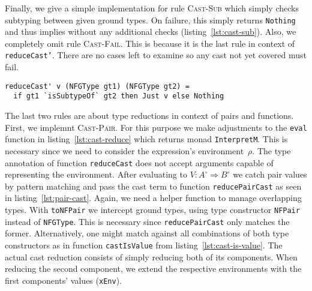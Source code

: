 Finally, we give a simple implementation for rule \textsc{Cast-Sub} which simply checks subtyping between given ground types. On failure, this simply returns \texttt{Nothing} and thus implies \blame without any additional checks (listing~\ref{lst:cast-sub}). Also, we completely omit rule \textsc{Cast-Fail}. This is because it is the last rule in context of \texttt{reduceCast'}. There are no cases left to examine so any cast not yet covered must fail.

\begin{lstlisting}[float,
	caption=Haskell: Rule \textsc{Cast-Sub} (\texttt{Interpreter.hs}),
	label=lst:cast-sub]
reduceCast' v (NFGType gt1) (NFGType gt2) =
  if gt1 `isSubtypeOf` gt2 then Just v else Nothing
\end{lstlisting}

The last two rules are about type reductions in context of pairs and functions. First, we implemnt \textsc{Cast-Pair}. For this purpose we make adjustments to the \texttt{eval} function in listing~\ref{lst:cast-reduce} which returns monad \texttt{InterpretM}. This is necessary since we need to consider the expression's environment~$\rho$. The type annotation of function \texttt{reduceCast} does not accept arguments capable of representing the environment. After evaluating to $V : A^\circ \Rightarrow B^\circ$ we catch pair values by pattern matching and pass the cast term to function \texttt{reducePairCast} as seen in listing~\ref{lst:pair-cast}. Again, we need a helper function to manage overlapping types. With \texttt{toNFPair} we intercept ground types, using type constructor \texttt{NFPair} instead of \texttt{NFGType}. This is necessary since \texttt{reducePairCast} only matches the former. Alternatively, one might match against all combinations of both type constructors as in function \texttt{castIsValue} from listing~\ref{lst:cast-is-value}. The actual cast reduction consists of simply reducing both of its components. When reducing the second component, we extend the respective environments with the first components' values (\texttt{xEnv}).


